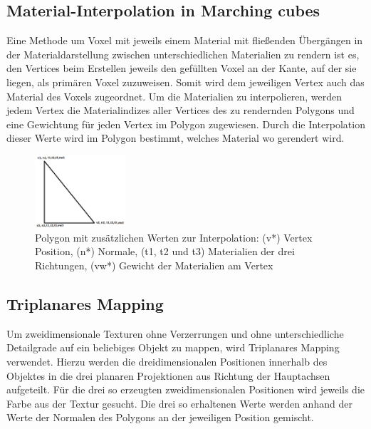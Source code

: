 \subsection{Material-Interpolation in Marching cubes}
\label{subsec:materialInterpolation}
Eine Methode um Voxel mit jeweils einem Material mit fließenden Übergängen in der Materialdarstellung zwischen unterschiedlichen Materialien zu rendern ist es, den Vertices beim Erstellen jeweils den gefüllten Voxel an der Kante, auf der sie liegen, als primären Voxel zuzuweisen. Somit wird dem jeweiligen Vertex auch das Material des Voxels zugeordnet. Um die Materialien zu interpolieren, werden jedem Vertex die Materialindizes aller Vertices des zu rendernden Polygons und eine Gewichtung für jeden Vertex im Polygon zugewiesen. Durch die Interpolation dieser Werte wird im Polygon bestimmt, welches Material wo gerendert wird. \cite{iomt}

\begin{figure}[H]
			\centering
			\includegraphics[width=0.3\textwidth]{figures/triangleCorrected}
			\caption[Polygon mit zusätzlichen Werten zur Interpolation\cite{iomt}]{Polygon mit zusätzlichen Werten zur Interpolation: (v*) Vertex Position, (n*) Normale, (t1, t2 und t3) Materialien der drei Richtungen, (vw*) Gewicht der Materialien am Vertex \label{PolygonMitZusatzWerten}}
			\end{figure}

\subsection{Triplanares Mapping}
\label{subsec:triplanaresMapping}
Um zweidimensionale Texturen ohne Verzerrungen und ohne unterschiedliche Detailgrade auf ein beliebiges Objekt zu mappen, wird Triplanares Mapping verwendet. Hierzu werden die dreidimensionalen Positionen innerhalb des Objektes in die drei planaren Projektionen aus Richtung der Hauptachsen aufgeteilt. Für die drei so erzeugten zweidimensionalen Positionen wird jeweils die Farbe aus der Textur gesucht. Die drei so erhaltenen Werte werden anhand der Werte der Normalen des Polygons an der jeweiligen Position gemischt. \cite{tpm}



